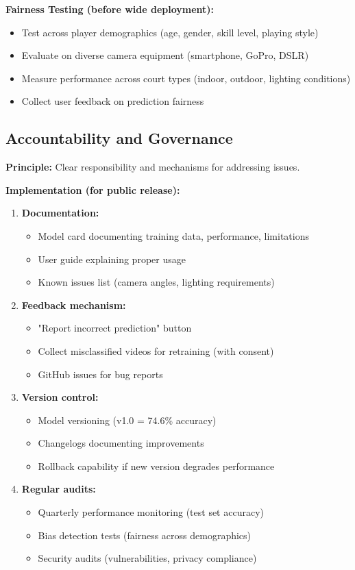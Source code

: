 \documentclass[11pt,a4paper]{article}
\begin{document}
\textbf{Fairness Testing (before wide deployment):}

\begin{itemize}
\item Test across player demographics (age, gender, skill level, playing style)
\item Evaluate on diverse camera equipment (smartphone, GoPro, DSLR)
\item Measure performance across court types (indoor, outdoor, lighting conditions)
\item Collect user feedback on prediction fairness
\end{itemize}

\subsection{Accountability and Governance}

\textbf{Principle:} Clear responsibility and mechanisms for addressing issues.

\textbf{Implementation (for public release):}

\begin{enumerate}
\item \textbf{Documentation:}
   \begin{itemize}
   \item Model card documenting training data, performance, limitations
   \item User guide explaining proper usage
   \item Known issues list (camera angles, lighting requirements)
   \end{itemize}

\item \textbf{Feedback mechanism:}
   \begin{itemize}
   \item "Report incorrect prediction" button
   \item Collect misclassified videos for retraining (with consent)
   \item GitHub issues for bug reports
   \end{itemize}

\item \textbf{Version control:}
   \begin{itemize}
   \item Model versioning (v1.0 = 74.6\% accuracy)
   \item Changelogs documenting improvements
   \item Rollback capability if new version degrades performance
   \end{itemize}

\item \textbf{Regular audits:}
   \begin{itemize}
   \item Quarterly performance monitoring (test set accuracy)
   \item Bias detection tests (fairness across demographics)
   \item Security audits (vulnerabilities, privacy compliance)
   \end{itemize}
\end{enumerate}
\end{document}
